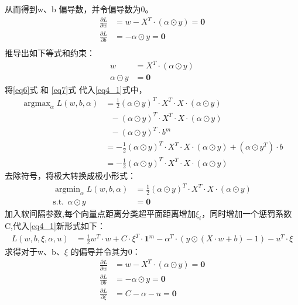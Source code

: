 \documentclass[12pt, a4paper, oneside]{ctexart}
\begin{document}
从而得到w、b 偏导数，并令偏导数为0。
\begin{align}
    \frac{\partial L}{\partial w} &= w - X^T\cdot(\alpha \odot y) = \boldsymbol{0}\nonumber \\
    \frac{\partial L}{\partial b} &= - \alpha \odot y \nonumber = \boldsymbol{0}\\
\end{align}
推导出如下等式和约束：
\begin{align}
    w &= X^T\cdot(\alpha \odot y) \label{eq6} \\
    \alpha \odot y &= \boldsymbol{0} \label{eq7}
\end{align}
将\eqref{eq6}式 和 \eqref{eq7}式 代入\eqref{eq4_1}式中，
\begin{align}
    \mathop{\arg\max}_{\alpha} L(w, b, {\alpha}) &= \frac{1}{2}(\alpha \odot y)^T \cdot X^T \cdot X \cdot (\alpha \odot y) \nonumber \\
                      & \ \ \  - (\alpha \odot y)^T \cdot X^T \cdot X \cdot (\alpha \odot y) \nonumber \\
                      & \ \ \  - (\alpha \odot y)^T \cdot b^m  \nonumber \\
                      &= -\frac{1}{2}(\alpha \odot y)^T \cdot X^T \cdot X \cdot (\alpha \odot y) + (\alpha \odot y^T) \cdot b \nonumber \\
                      &= -\frac{1}{2}(\alpha \odot y)^T \cdot X^T \cdot X \cdot (\alpha \odot y) \nonumber 
\end{align}
去除符号，将极大转换成极小形式：
\begin{align}
    \mathop{\arg\min}_{\alpha} L(w, b, {\alpha}) &= \frac{1}{2}(\alpha \odot y)^T \cdot X^T \cdot X \cdot (\alpha \odot y) \label{eq9} \\
        \mathrm{ s.t. }\ \   \alpha \odot y &= \boldsymbol{0} \nonumber 
\end{align}
加入软间隔参数,每个向量点距离分类超平面距离增加$\xi_i$，同时增加一个惩罚系数C,代入\eqref{eq4_1}新形式如下：
\begin{align}
    L(w, b, \xi, {\alpha}, u) &= \frac{1}{2}w^T \cdot w + C \cdot \xi^T \cdot\boldsymbol{1}^m   - {\alpha} ^T \cdot  (y \odot (X \cdot w + b) - 1) - u^T \cdot \xi  \label{eq10} 
\end{align}
求得对于w、b、$\xi$ 的偏导并令其为0：
\begin{align}
    \frac{\partial L}{\partial w} &= w - X^T\cdot(\alpha \odot y) = \boldsymbol{0} \nonumber \\
    \frac{\partial L}{\partial b} &= - \alpha \odot y  = \boldsymbol{0} \nonumber  \\
    \frac{\partial L}{\partial \xi} &= C - \alpha - u  = \boldsymbol{0} \nonumber 
\end{align}
\end{document}
